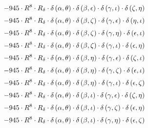 \begin{subequations}
\begin{gather}
 \\[0.2em] \notag 		 - 945 \cdot R^{8} \cdot R_{\delta{}} \cdot \delta{}\left(\alpha{}, \theta{}\right) \cdot \delta{}\left(\beta{}, \epsilon{}\right) \cdot \delta{}\left(\gamma{}, \iota{}\right) \cdot \delta{}\left(\zeta{}, \eta{}\right) 
 \\[0.2em] \notag 		 - 945 \cdot R^{8} \cdot R_{\delta{}} \cdot \delta{}\left(\alpha{}, \theta{}\right) \cdot \delta{}\left(\beta{}, \zeta{}\right) \cdot \delta{}\left(\gamma{}, \epsilon{}\right) \cdot \delta{}\left(\eta{}, \iota{}\right) 
 \\[0.2em] \notag 		 - 945 \cdot R^{8} \cdot R_{\delta{}} \cdot \delta{}\left(\alpha{}, \theta{}\right) \cdot \delta{}\left(\beta{}, \zeta{}\right) \cdot \delta{}\left(\gamma{}, \eta{}\right) \cdot \delta{}\left(\epsilon{}, \iota{}\right) 
 \\[0.2em] \notag 		 - 945 \cdot R^{8} \cdot R_{\delta{}} \cdot \delta{}\left(\alpha{}, \theta{}\right) \cdot \delta{}\left(\beta{}, \zeta{}\right) \cdot \delta{}\left(\gamma{}, \iota{}\right) \cdot \delta{}\left(\epsilon{}, \eta{}\right) 
 \\[0.2em] \notag 		 - 945 \cdot R^{8} \cdot R_{\delta{}} \cdot \delta{}\left(\alpha{}, \theta{}\right) \cdot \delta{}\left(\beta{}, \eta{}\right) \cdot \delta{}\left(\gamma{}, \epsilon{}\right) \cdot \delta{}\left(\zeta{}, \iota{}\right) 
 \\[0.2em] \notag 		 - 945 \cdot R^{8} \cdot R_{\delta{}} \cdot \delta{}\left(\alpha{}, \theta{}\right) \cdot \delta{}\left(\beta{}, \eta{}\right) \cdot \delta{}\left(\gamma{}, \zeta{}\right) \cdot \delta{}\left(\epsilon{}, \iota{}\right) 
 \\[0.2em] \notag 		 - 945 \cdot R^{8} \cdot R_{\delta{}} \cdot \delta{}\left(\alpha{}, \theta{}\right) \cdot \delta{}\left(\beta{}, \eta{}\right) \cdot \delta{}\left(\gamma{}, \iota{}\right) \cdot \delta{}\left(\epsilon{}, \zeta{}\right) 
 \\[0.2em] \notag 		 - 945 \cdot R^{8} \cdot R_{\delta{}} \cdot \delta{}\left(\alpha{}, \theta{}\right) \cdot \delta{}\left(\beta{}, \iota{}\right) \cdot \delta{}\left(\gamma{}, \epsilon{}\right) \cdot \delta{}\left(\zeta{}, \eta{}\right) 
 \\[0.2em] \notag 		 - 945 \cdot R^{8} \cdot R_{\delta{}} \cdot \delta{}\left(\alpha{}, \theta{}\right) \cdot \delta{}\left(\beta{}, \iota{}\right) \cdot \delta{}\left(\gamma{}, \zeta{}\right) \cdot \delta{}\left(\epsilon{}, \eta{}\right) 
 \\[0.2em] \notag 		 - 945 \cdot R^{8} \cdot R_{\delta{}} \cdot \delta{}\left(\alpha{}, \theta{}\right) \cdot \delta{}\left(\beta{}, \iota{}\right) \cdot \delta{}\left(\gamma{}, \eta{}\right) \cdot \delta{}\left(\epsilon{}, \zeta{}\right) 

\end{gather}
\end{subequations}
